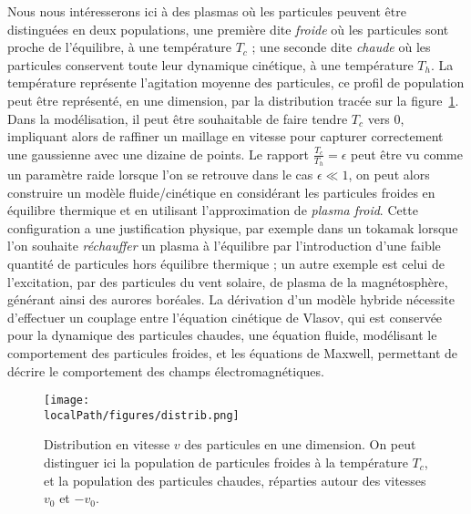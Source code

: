 Nous nous intéresserons ici à des plasmas où les particules peuvent être distinguées en deux populations, une première dite \emph{froide} où les particules sont proche de l'équilibre, à une température $T_c$ ; une seconde dite \emph{chaude} où les particules conservent toute leur dynamique cinétique, à une température $T_h$. La température représente l'agitation moyenne des particules, ce profil de population peut être représenté, en une dimension, par la distribution tracée sur la figure~\ref{fig:intro:distrib}. Dans la modélisation, il peut être souhaitable de faire tendre $T_c$ vers $0$, impliquant alors de raffiner un maillage en vitesse pour capturer correctement une gaussienne avec une dizaine de points. Le rapport $\frac{T_c}{T_h}=\epsilon$ peut être vu comme un paramètre raide lorsque l'on se retrouve dans le cas $\epsilon \ll 1$, on peut alors construire un modèle fluide/cinétique en considérant les particules froides en équilibre thermique et en utilisant l'approximation de \emph{plasma froid}. Cette configuration a une justification physique, par exemple dans un tokamak lorsque l'on souhaite \emph{réchauffer} un plasma à l'équilibre par l'introduction d'une faible quantité de particules hors équilibre thermique ; un autre exemple est celui de l’excitation, par des particules du vent solaire, de plasma de la magnétosphère, générant ainsi des aurores boréales. La dérivation d'un modèle hybride nécessite d'effectuer un couplage entre l'équation cinétique de Vlasov, qui est conservée pour la dynamique des particules chaudes, une équation fluide, modélisant le comportement des particules froides, et les équations de Maxwell, permettant de décrire le comportement des champs électromagnétiques. 

\begin{figure}[h]
  \centering
  \texttt{[image: \\localPath/figures/distrib.png]}
  \caption{Distribution en vitesse $v$ des particules en une dimension. On peut distinguer ici la population de particules froides à la température $T_c$, et la population des particules chaudes, réparties autour des vitesses $v_0$ et $-v_0$.}
  \label{fig:intro:distrib}
\end{figure}
